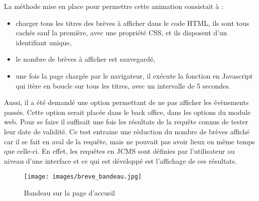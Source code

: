 \documentclass[12pt,a4paper]{article}
\begin{document}
La méthode mise en place pour permettre cette animation consistait à :
\begin{itemize}
\item charger tous les titres des brèves à afficher dans le code \gls{HTML}, ils sont tous cachés sauf la première, avec une propriété \gls{CSS}, et ils disposent d'un identifiant unique,
\item le nombre de brèves à afficher est sauvegardé,
\item une fois la page chargée par le navigateur, il exécute la fonction en Javascript qui itère en boucle sur tous les titres, avec un intervalle de 5 secondes.
\end{itemize}
Aussi, il a été demandé une option permettant de ne pas afficher les évènements passés. Cette option serait placée dans le back office, dans les options du module web. Pour se faire il suffisait une fois les résultats de la requête connus de tester leur date de validité. Ce test entraine une réduction du nombre de brèves affiché car il se fait en aval de la requête, mais ne pouvait pas avoir lieux en même temps que celle-ci. En effet, les requêtes en \gls{JCMS} sont définies par l'utilisateur au niveau d'une interface et ce qui est développé est l'affichage de ces résultats.\par
\begin{figure}[h!]
\centering\texttt{[image: images/breve\_bandeau.jpg]} 
\caption{Bandeau sur la page d'accueil}
\end{figure}
\end{document}
